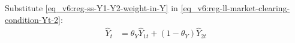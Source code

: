 \documentclass[../thesis.tex]{subfiles}
\begin{document}

Substitute \ref{eq_v6:reg-ss-Y1-Y2-weight-in-Y} in \ref{eq_v6:reg-ll-market-clearing-condition-Yt-2}:
\begin{align}
	\hat{Y}_{t} &= \theta_{Y} \hat{Y}_{1t} + (1-\theta_{Y}) \hat{Y}_{2t} \label{eq_v6:reg-ll-market-clearing-condition-Yt-3}
\end{align}


\begin{comment}
	\subsubsection*{National Price Level}
	
	Log-linearize \ref{eq_v6:reg-national-price-level}:
	\begin{alignat}{2}
		P_{t} Y_{t} &= P_{1t} Y_{1t} + P_{2t} Y_{2t} & \implies \tag{\ref{eq_v6:reg-national-price-level}} \\ 
		P Y (1 + \hat{P}_{t} + \hat{Y}_{t}) &= P_{1} Y_{1} (1 + \hat{P}_{1t} + \hat{Y}_{1t}) + P_{2} Y_{2} (1 + \hat{P}_{2t} + \hat{Y}_{2t}) &\implies \nonumber \\
		\hat{P}_{t} + \hat{Y}_{t} &= \frac{Y_{1}}{Y} (\hat{P}_{1t} + \hat{Y}_{1t}) + \frac{Y_{2}}{Y} (\hat{P}_{2t} + \hat{Y}_{2t}) \label{eq_v6:reg-ll-national-price-level}
	\end{alignat}	
	
	Substitute \ref{eq_v6:reg-ss-Y1-Y2-weight-in-Y} in \ref{eq_v6:reg-ll-national-price-level}:
	\begin{alignat}{2}
		\hat{P}_{t} + \hat{Y}_{t} &= \theta_{Y} (\hat{P}_{1t} + \hat{Y}_{1t}) + (1-\theta_{Y}) (\hat{P}_{2t} + \hat{Y}_{2t})  \label{eq_v6:reg-ll-national-price-level-2}
	\end{alignat}
	
	Subtract \ref{eq_v6:reg-ll-market-clearing-condition-Yt-3} from \ref{eq_v6:reg-ll-national-price-level-2}:
	\begin{alignat}{2}
		\hat{P}_{t} + \hat{Y}_{t} - \hat{Y}_{t} &= \theta_{Y} (\hat{P}_{1t} + \hat{Y}_{1t}) + (1-\theta_{Y}) (\hat{P}_{2t} + \hat{Y}_{2t}) - \nonumber \\ & \qquad \qquad - (\theta_{Y} \hat{Y}_{1t} + (1-\theta_{Y}) \hat{Y}_{2t}) \implies \nonumber \\
		\hat{P}_{t} &= \theta_{Y} \hat{P}_{1t} + (1-\theta_{Y}) \hat{P}_{2t} \label{eq_v6:reg-ll-national-price-level-3}
	\end{alignat}
	
\end{comment}
\end{document}
